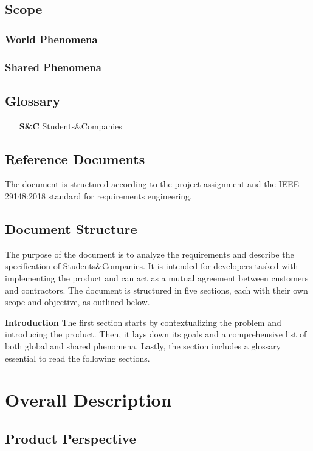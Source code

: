 \documentclass[a4paper, oneside]{book}
\begin{document}
\section{Scope}
\subsection{World Phenomena}
\subsection{Shared Phenomena}
\section{Glossary}
\begin{itemize}
    \item[\textbf{S\&C}] Students\&Companies
\end{itemize}

\section{Reference Documents}
The document is structured according to the project assignment and the IEEE 29148:2018 \cite{ieee2018} standard for requirements engineering.

\section{Document Structure}
The purpose of the document is to analyze the requirements and describe the specification of Students\&Companies.
It is intended for developers tasked with implementing the product and can act as a mutual agreement between customers and contractors.
The document is structured in five sections, each with their own scope and objective, as outlined below.

\textbf{Introduction} The first section starts by contextualizing the problem and introducing the product.
Then, it lays down its goals and a comprehensive list of both global and shared phenomena.
Lastly, the section includes a glossary essential to read the following sections.

\chapter{Overall Description}
\section{Product Perspective}
\end{document}
